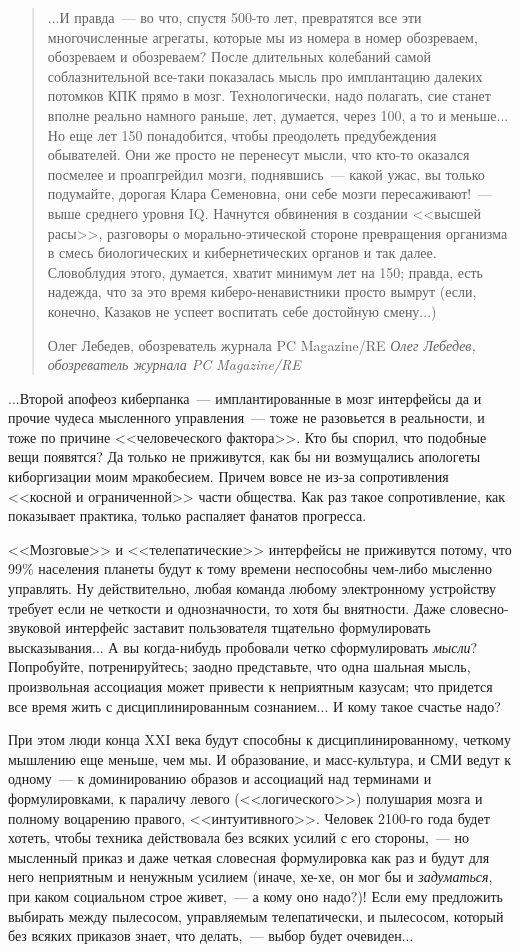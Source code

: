 \documentclass{scrbook}
\makeatletter
\newcommand{\flqq}{<<}
\newcommand{\frqq}{>>}
\newcommand{\mdash}{~--- }
\newcommand{\commamdash}{~--- } %
\newcommand{\inlineauthor}[1]{\emph{#1}}
\newcommand{\myquotation}[2][\@empty]{
	\begin{quotation}
	#2

	\ifx\@empty#1
	\else
		\nopagebreak	
		\inlineauthor{#1}
	\fi
	\end{quotation}
}
\makeatother
\begin{document}
\myquotation[Олег Лебедев, обозреватель журнала PC Magazine/RE]{...И правда{\mdash}во что, спустя 500-то лет, превратятся все эти многочисленные агрегаты, которые мы из номера в номер обозреваем, обозреваем и обозреваем? После длительных колебаний самой соблазнительной все-таки показалась мысль про имплантацию далеких потомков КПК прямо в мозг. Технологически, надо полагать, сие станет вполне реально намного раньше, лет, думается, через 100, а то и меньше... Но еще лет 150 понадобится, чтобы преодолеть предубеждения обывателей. Они же просто не перенесут мысли, что кто-то оказался посмелее и проапгрейдил мозги, поднявшись{\mdash}какой ужас, вы только подумайте, дорогая Клара Семеновна, они себе мозги пересаживают!{\mdash}выше среднего уровня IQ. Начнутся обвинения в создании {\flqq}высшей расы{\frqq}, разговоры о морально-этической стороне превращения организма в смесь биологических и кибернетических органов и так далее. Словоблудия этого, думается, хватит минимум лет на 150; правда, есть надежда, что за это время киберо-ненавистники просто вымрут (если, конечно, Казаков не успеет воспитать себе достойную смену...)}

...Второй апофеоз киберпанка{\mdash}имплантированные в мозг интерфейсы да и прочие чудеса мысленного управления{\mdash}тоже не разовьется в реальности, и тоже по причине {\flqq}человеческого фактора{\frqq}. Кто бы спорил, что подобные вещи появятся? Да только не приживутся, как бы ни возмущались апологеты киборгизации моим мракобесием. Причем вовсе не из-за сопротивления {\flqq}косной и ограниченной{\frqq} части общества. Как раз такое сопротивление, как показывает практика, только распаляет фанатов прогресса.

{\flqq}Мозговые{\frqq} и {\flqq}телепатические{\frqq} интерфейсы не приживутся потому, что 99\% населения планеты будут к тому времени неспособны чем-либо мысленно управлять. Ну действительно, любая команда любому электронному устройству требует если не четкости и однозначности, то хотя бы внятности. Даже словесно-звуковой интерфейс заставит пользователя тщательно формулировать высказывания... А вы когда-нибудь пробовали четко сформулировать \emph{мысли}? Попробуйте, потренируйтесь; заодно представьте, что одна шальная мысль, произвольная ассоциация может привести к неприятным казусам; что придется все время жить с дисциплинированным сознанием... И кому такое счастье надо?

При этом люди конца XXI века будут способны к дисциплинированному, четкому мышлению еще меньше, чем мы. И образование, и масс-культура, и СМИ ведут к одному{\mdash}к доминированию образов и ассоциаций над терминами и формулировками, к параличу левого ({\flqq}логического{\frqq}) полушария мозга и полному воцарению правого, {\flqq}интуитивного{\frqq}. Человек 2100-го года будет хотеть, чтобы техника действовала без всяких усилий с его стороны,{\commamdash}но мысленный приказ и даже четкая словесная формулировка как раз и будут для него неприятным и ненужным усилием (иначе, хе-хе, он мог бы и \emph{задуматься}, при каком социальном строе живет,{\commamdash}а кому оно надо?)! Если ему предложить выбирать между пылесосом, управляемым телепатически, и пылесосом, который без всяких приказов знает, что делать,{\commamdash}выбор будет очевиден...
\end{document}
